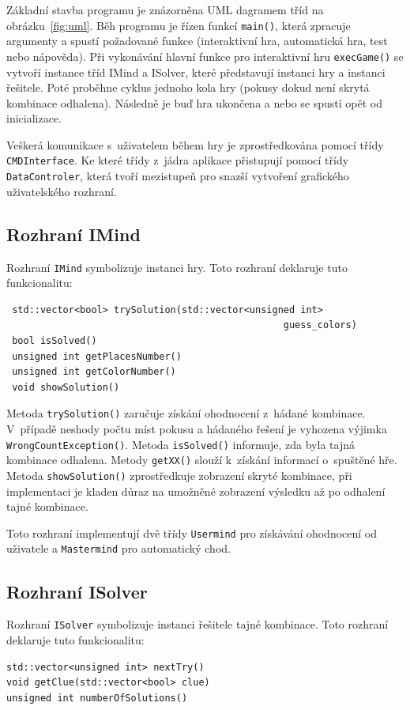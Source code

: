 \documentclass[12pt, a4paper]{article}
\begin{document}
Základní stavba programu je znázorněna UML dagramem tříd na obrázku~\ref{fig:uml}. Běh programu je řízen funkcí \texttt{main()}, která zpracuje argumenty a spustí požadované funkce (interaktivní hra, automatická hra, test nebo nápověda). Při vykonávání hlavní funkce pro interaktivní hru \texttt{execGame()} se vytvoří instance tříd IMind a ISolver, které představují instanci hry a instanci řešitele. Poté proběhne cyklus jednoho kola hry (pokusy dokud není skrytá kombinace odhalena). Následně je buď hra ukončena a nebo se spustí opět od inicializace.

Veškerá komunikace s~uživatelem během hry je zprostředkována pomocí třídy \texttt{CMDInterface}. Ke které třídy z~jádra aplikace přistupují pomocí třídy \texttt{DataControler}, která tvoří mezistupeň pro snazší vytvoření grafického uživatelského rozhraní.

\subsection{Rozhraní IMind}
Rozhraní \texttt{IMind} symbolizuje instanci hry. Toto rozhraní deklaruje tuto funkcionalitu:
\begin{verbatim}
 std::vector<bool> trySolution(std::vector<unsigned int> 
                                                 guess_colors)
 bool isSolved()
 unsigned int getPlacesNumber()
 unsigned int getColorNumber()
 void showSolution()
\end{verbatim}
Metoda \texttt{trySolution()} zaručuje získání ohodnocení z~hádané kombinace. V~případě neshody počtu míst pokusu a hádaného řešení je vyhozena výjimka \texttt{WrongCountException()}. Metoda \texttt{isSolved()} informuje, zda byla tajná kombinace odhalena. Metody \texttt{getXX()} slouží k~získání informací o~spuštěné hře. Metoda \texttt{showSolution()} zprostředkuje zobrazení skryté kombinace, při implementaci je kladen důraz na umožněné zobrazení výsledku až po odhalení tajné kombinace.

Toto rozhraní implementují dvě třídy \texttt{Usermind} pro získávání ohodnocení od uživatele a \texttt{Mastermind} pro automatický chod. 

\subsection{Rozhraní ISolver}
Rozhraní \texttt{ISolver} symbolizuje instanci řešitele tajné kombinace. Toto rozhraní deklaruje tuto funkcionalitu:
\begin{verbatim}
std::vector<unsigned int> nextTry()
void getClue(std::vector<bool> clue)
unsigned int numberOfSolutions()
\end{verbatim}
\end{document}
